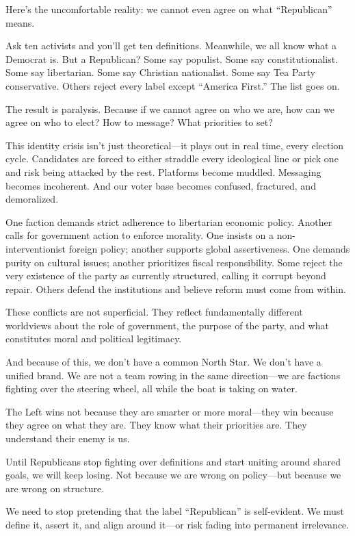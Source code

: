 Here’s the uncomfortable reality: we cannot even agree on what “Republican” means.

Ask ten activists and you’ll get ten definitions. Meanwhile, we all know what a Democrat is. But a Republican? Some say populist. Some say constitutionalist. Some say libertarian. Some say Christian nationalist. Some say Tea Party conservative. Others reject every label except “America First.” The list goes on.

The result is paralysis. Because if we cannot agree on who we are, how can we agree on who to elect? How to message? What priorities to set?

This identity crisis isn’t just theoretical—it plays out in real time, every election cycle. Candidates are forced to either straddle every ideological line or pick one and risk being attacked by the rest. Platforms become muddled. Messaging becomes incoherent. And our voter base becomes confused, fractured, and demoralized.

One faction demands strict adherence to libertarian economic policy. Another calls for government action to enforce morality. One insists on a non-interventionist foreign policy; another supports global assertiveness. One demands purity on cultural issues; another prioritizes fiscal responsibility. Some reject the very existence of the party as currently structured, calling it corrupt beyond repair. Others defend the institutions and believe reform must come from within.

These conflicts are not superficial. They reflect fundamentally different worldviews about the role of government, the purpose of the party, and what constitutes moral and political legitimacy.

And because of this, we don’t have a common North Star. We don’t have a unified brand. We are not a team rowing in the same direction—we are factions fighting over the steering wheel, all while the boat is taking on water.

The Left wins not because they are smarter or more moral—they win because they agree on what they are. They know what their priorities are. They understand their enemy is us.

Until Republicans stop fighting over definitions and start uniting around shared goals, we will keep losing. Not because we are wrong on policy—but because we are wrong on structure.

We need to stop pretending that the label “Republican” is self-evident. We must define it, assert it, and align around it—or risk fading into permanent irrelevance.

